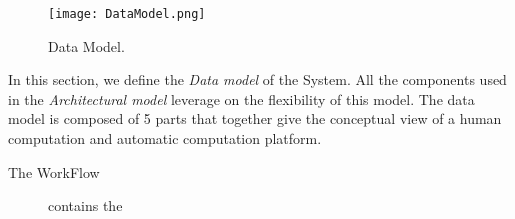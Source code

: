 \begin{figure}[htb]
    \centering
    \hspace{-7em}
    \texttt{[image: DataModel.png]}
    \caption{Data Model.}
    \label{fig:data-model}
\end{figure}
In this section, we define the \emph{Data model} of the System. All the components
used in the \emph{Architectural model} leverage on the flexibility of this model.
The data model is composed of 5 parts that together give the conceptual view
of a human computation and automatic computation platform.

\begin{description}
	\item[The WorkFlow] contains the
\end{description}

